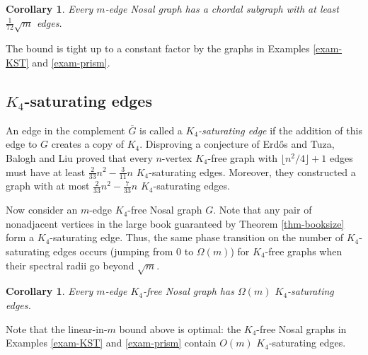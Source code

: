 \documentclass[11pt,a4paper]{article}
\newtheorem{cor}[theorem]{Corollary}
\theoremstyle{definition}
\theoremstyle{remark}
\begin{document}
\begin{cor}
Every $m$-edge Nosal graph has a chordal subgraph with at least $\frac{1}{72} \sqrt{m}$ edges. 
\end{cor}

The bound is tight up to a constant factor by the graphs in Examples \ref{exam-KST} and \ref{exam-prism}.






\subsection{$K_4$-saturating edges}
An edge in the complement $\overline{G}$ is called 
a \emph{$K_4$-saturating edge} if the addition of this edge to $G$ creates a copy of $K_4$. 
Disproving a conjecture of Erd\H{o}s and Tuza, 
 Balogh and Liu \cite{BL2014} proved that every $n$-vertex $K_4$-free graph 
 with $\lfloor n^2/4\rfloor +1$ edges must have at least 
 $\frac{2}{33}n^2 - \frac{3}{11}n$ $K_4$-saturating edges. 
 Moreover, they constructed a graph with at most 
 $\frac{2}{33}n^2 - \frac{7}{33}n$ $K_4$-saturating edges. 

Now consider an $m$-edge $K_4$-free Nosal graph $G$. Note that any pair of nonadjacent vertices in the large book guaranteed by Theorem \ref{thm-booksize} form a $K_4$-saturating edge. Thus, the same phase transition on the number of $K_4$-saturating edges occurs (jumping from 0 to $\Omega(m)$) for $K_4$-free graphs when their spectral radii go beyond $\sqrt{m}$.

\begin{cor} \label{coro-K4-sat} 
Every $m$-edge $K_4$-free Nosal graph has $\Omega(m)$ $K_4$-saturating edges.
\end{cor}

Note that the linear-in-$m$ bound above is optimal: the $K_4$-free Nosal graphs in Examples \ref{exam-KST} and \ref{exam-prism} contain $O(m)$ $K_4$-saturating edges. 

\end{document}
